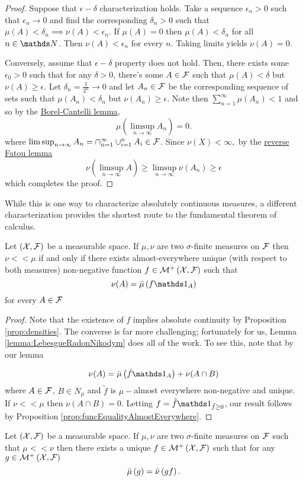 \begin{proof}
Suppose that $\epsilon-\delta$ characterization holds. Take a sequence
$\epsilon_{n}>0$ such that $\epsilon_{n}\to0$ and find the corresponding
$\delta_{n}>0$ such that $\mu(A)<\delta_{n}\implies\nu(A)<\epsilon_{n}$.
If $\mu(A)=0$ then $\mu(A)<\delta_{n}$ for all $n\in\N$. Then $\nu(A)<\epsilon_{n}$
for every $n.$ Taking limits yields $\nu(A)=0.$

Conversely, assume that $\epsilon-\delta$ property does not hold.
Then, there exists some $\epsilon_{0}>0$ such that for any $\delta>0$,
there's some $A\in\mathcal{F}$ such that $\mu(A)<\delta$ but $\nu(A)\geq\epsilon$.
Let $\delta_{n}=\frac{1}{2^{n}}\to0$ and let $A_{n}\in\mathcal{F}$ be the
corresponding sequence of sets such that $\mu(A_{n})<\delta_{n}$
but $\nu(A_{n})\geq\epsilon.$ Note then $\sum_{n=1}^{\infty}\mu(A_{n})<1$
and so by the \hyperref[thm:borelCantelli]{Borel-Cantelli lemma},
\[
\mu(\limsup_{n\to\infty}A_{n})=0.
\]
where $\limsup_{n\to\infty}A_{n}=\cap_{n=1}^{\infty}\cup_{i=1}^{n}A_{i}\in\mathcal{F}$.
Since $\nu(X)<\infty,$ by the \hyperref[cor:reverseFatouLemma]{reverse Fatou lemma}
\[
\nu(\limsup_{n\to\infty}A)\geq\limsup_{n\to\infty}\nu(A_{n})\geq\epsilon
\]
which completes the proof.
\end{proof}
While this is one way to characterize absolutely continuous measures,
a different characterization provides the shortest route to the fundamental
theorem of calculus.
\begin{thm}
\label{thm:radonNikodym}Let $\left(\mathcal{X},\mathcal{F}\right)$ be a measurable
space. If $\mu,\nu$ are two $\sigma$-finite measures on $\mathcal{F}$ then
$\nu<<\mu$ if and only if there exists almost-everywhere unique (with
respect to both measures) non-negative function $f\in\mathcal{M}^{+}\left(\mathcal{X},\mathcal{F}\right)$
such that 
\[
\nu(A)=\lebInt{\mu}{f\indicate_{A}}
\]
for every $A\in\mathcal{F}$
\end{thm}

\begin{proof}
Note that the existence of $f$ implies absolute continuity by Proposition
\ref{prop:densities}. The converse is far more challenging; fortunately
for us, Lemma \ref{lemma:LebesgueRadonNikodym} does all of the work.
To see this, note that by our lemma

\[
\nu(A)=\lebInt{\mu}{\tilde{f}\indicate_{A}}+\nu(A\cap B)
\]
where $A\in\mathcal{F}$, $B\in N_{\mu}$ and $\tilde{f}$ is $\mu-$almost
everywhere non-negative and unique. If $\nu<<\mu$ then $\nu(A\cap B)=0$.
Letting $f=\tilde{f}\indicate_{{\tilde{f}\geq0}}$, our result follows
by Proposition \ref{prop:funcEqualityAlmostEverywhere}.
\end{proof}
\begin{cor}
\label{cor:radonNikodymIntegral}Let $\left(\mathcal{X},\mathcal{F}\right)$ be a measurable
space. If $\mu,\nu$ are two $\sigma$-finite measures on $\mathcal{F}$ such
that $\mu<<\nu$ then there exists a unique $f\in\mathcal{M}^{+}\left(\mathcal{X},\mathcal{F}\right)$
such that for any $g\in\mathcal{M}^{+}\left(\mathcal{X},\mathcal{F}\right)$ 
\[
\bar{\mu}\left(g\right)=\bar{\nu}\left(gf\right).
\]
\end{cor}

